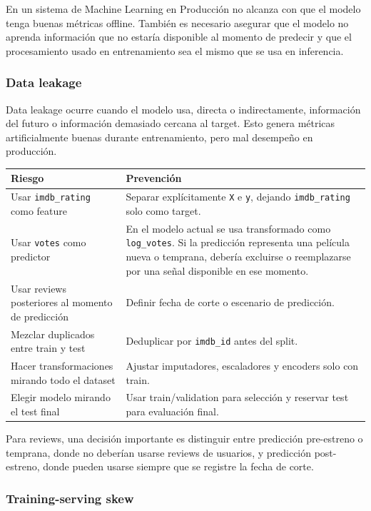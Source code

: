 \documentclass[letterpaper,12pt]{article}
\begin{document}
En un sistema de Machine Learning en Producción no alcanza con que el modelo tenga buenas métricas offline. También es necesario asegurar que el modelo no aprenda información que no estaría disponible al momento de predecir y que el procesamiento usado en entrenamiento sea el mismo que se usa en inferencia.

\subsubsection{Data leakage}

Data leakage ocurre cuando el modelo usa, directa o indirectamente, información del futuro o información demasiado cercana al target. Esto genera métricas artificialmente buenas durante entrenamiento, pero mal desempeño en producción.

\begin{longtable}{p{6cm}p{10cm}}
\toprule
\textbf{Riesgo} & \textbf{Prevención} \\
\midrule
Usar \texttt{imdb\_rating} como feature & Separar explícitamente \texttt{X} e \texttt{y}, dejando \texttt{imdb\_rating} solo como target. \\
Usar \texttt{votes} como predictor & En el modelo actual se usa transformado como \texttt{log\_votes}. Si la predicción representa una película nueva o temprana, debería excluirse o reemplazarse por una señal disponible en ese momento. \\
Usar reviews posteriores al momento de predicción & Definir fecha de corte o escenario de predicción. \\
Mezclar duplicados entre train y test & Deduplicar por \texttt{imdb\_id} antes del split. \\
Hacer transformaciones mirando todo el dataset & Ajustar imputadores, escaladores y encoders solo con train. \\
Elegir modelo mirando el test final & Usar train/validation para selección y reservar test para evaluación final. \\
\bottomrule
\end{longtable}

Para reviews, una decisión importante es distinguir entre predicción pre-estreno o temprana, donde no deberían usarse reviews de usuarios, y predicción post-estreno, donde pueden usarse siempre que se registre la fecha de corte.

\subsubsection{Training-serving skew}
\end{document}
